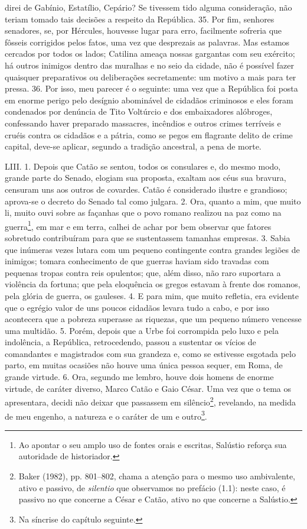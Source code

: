 direi de Gabínio, Estatílio, Cepário? Se tivessem tido alguma consideração, não
teriam tomado tais decisões a respeito da República. 35. Por fim, senhores
senadores, se, por Hércules, houvesse lugar para erro, facilmente sofreria que
fôsseis corrigidos pelos fatos, uma vez que desprezais as palavras. Mas estamos
cercados por todos os lados; Catilina ameaça nossas gargantas com seu exército;
há outros inimigos dentro das muralhas e no seio da cidade, não é possível
fazer quaisquer preparativos ou deliberações secretamente: um motivo a mais
para ter pressa. 36. Por isso, meu parecer é o seguinte: uma vez que a
República foi posta em enorme perigo pelo desígnio abominável de cidadãos
criminosos e eles foram condenados por denúncia de Tito Voltúrcio e dos
embaixadores alóbroges, confessando haver preparado massacres, incêndios e
outros crimes terríveis e cruéis contra os cidadãos e a pátria, como se pegos
em flagrante delito de crime capital, deve-se aplicar, segundo a tradição
ancestral, a pena de morte.

LIII. 1. Depois que Catão se sentou, todos os consulares e, do mesmo modo,
grande parte do Senado, elogiam sua proposta, exaltam aos céus sua bravura, censuram uns aos outros de covardes. Catão é considerado ilustre e
grandioso; aprova-se o decreto do Senado tal como julgara. 2. Ora, quanto a
mim, que muito li, muito ouvi sobre as façanhas que o povo romano realizou na
paz como na guerra\footnote{Ao apontar o seu amplo uso de fontes orais e
escritas, Salústio reforça sua autoridade de historiador.}, em mar e em terra,
calhei de achar por bem observar que fatores sobretudo contribuíram para que se
sustentassem tamanhas empresas. 3. Sabia que inúmeras vezes lutara com um
pequeno contingente contra grandes legiões de inimigos; tomara conhecimento de
que guerras haviam sido travadas com pequenas tropas contra reis opulentos;
que, além disso, não raro suportara a violência da fortuna; que pela eloquência
os gregos estavam à frente dos romanos, pela glória de guerra, os gauleses. 4.
E para mim, que muito refletia, era evidente que o egrégio valor de uns poucos
cidadãos levara tudo a cabo, e por isso acontecera que a pobreza superasse as
riquezas, que um pequeno número vencesse uma multidão. 5. Porém, depois que a
Urbe foi corrompida pelo luxo e pela indolência, a República, retrocedendo,
passou a sustentar os vícios de comandantes e magistrados com sua grandeza e,
como se estivesse esgotada pelo parto, em muitas ocasiões não houve uma única
pessoa sequer, em Roma, de grande virtude. 6. Ora, segundo me lembro, houve
dois homens de enorme virtude, de caráter diverso, Marco Catão e Gaio César.
Uma vez que o tema os apresentara, decidi não deixar que passassem em
silêncio\footnote{Baker (1982), pp. 801--802, chama a atenção para o mesmo uso
ambivalente, ativo e passivo, de \emph{silentio} que observamos no prefácio (1.1): neste caso, é passivo no que concerne a César e Catão, ativo no que
concerne a Salústio.}, revelando, na medida de meu engenho, a natureza e o
caráter de um e outro\footnote{Na síncrise do capítulo seguinte.}. 

